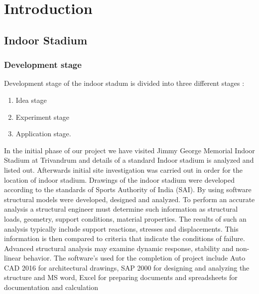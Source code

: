 \chapter{Introduction}
	\section{Indoor Stadium }
\subsection{Development stage}
Development stage of the indoor stadum is divided into three different stages :
\begin{enumerate}
	\item Idea stage
	\item Experiment stage
	\item Application stage.
\end{enumerate}	

In the initial phase of our project we have visited Jimmy George Memorial Indoor Stadium at Trivandrum and details of a standard Indoor stadium is analyzed and listed out. Afterwards initial site investigation was carried out in order for the location of indoor stadium. Drawings of the indoor stadium were developed according to the standards of Sports Authority of India (SAI).
By using software structural models were developed, designed and analyzed. To perform an accurate analysis a structural engineer must determine such information as structural loads, geometry, support conditions, material properties. The results of such an analysis typically include support reactions, stresses and displacements. This information is then compared to criteria that indicate the conditions of failure. Advanced structural analysis may examine dynamic response, stability and non-linear behavior.
The software’s used for the completion of project include Auto CAD 2016 for architectural drawings, SAP 2000 for designing and analyzing the structure and MS word, Excel for preparing documents and spreadsheets for documentation and calculation

